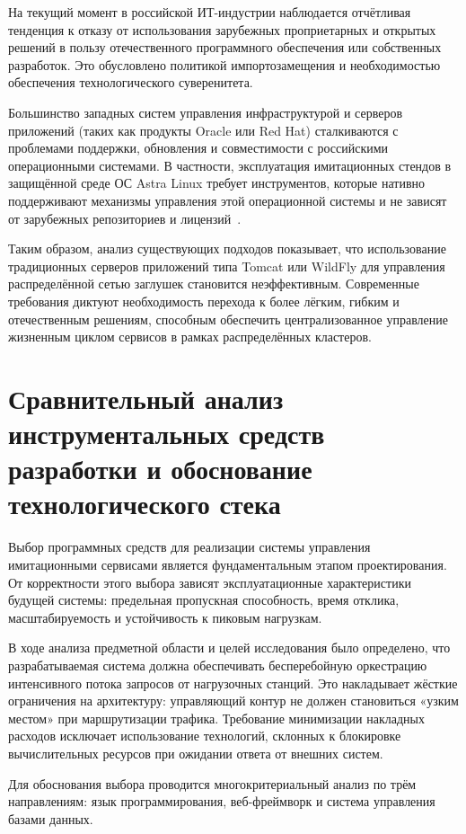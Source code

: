 На текущий момент в российской ИТ-индустрии наблюдается отчётливая тенденция к отказу от использования зарубежных проприетарных и открытых решений в пользу отечественного программного обеспечения или собственных разработок. Это обусловлено политикой импортозамещения и необходимостью обеспечения технологического суверенитета.

Большинство западных систем управления инфраструктурой и серверов приложений (таких как продукты Oracle или Red Hat) сталкиваются с проблемами поддержки, обновления и совместимости с российскими операционными системами. В частности, эксплуатация имитационных стендов в защищённой среде ОС Astra Linux требует инструментов, которые нативно поддерживают механизмы управления этой операционной системы и не зависят от зарубежных репозиториев и лицензий~\cite{burenin-astra}.

Таким образом, анализ существующих подходов показывает, что использование традиционных серверов приложений типа Tomcat или WildFly для управления распределённой сетью заглушек становится неэффективным. Современные требования диктуют необходимость перехода к более лёгким, гибким и отечественным решениям, способным обеспечить централизованное управление жизненным циклом сервисов в рамках распределённых кластеров.

\section{Сравнительный анализ инструментальных средств разработки и обоснование технологического стека}

Выбор программных средств для реализации системы управления имитационными сервисами является фундаментальным этапом проектирования. От корректности этого выбора зависят эксплуатационные характеристики будущей системы: предельная пропускная способность, время отклика, масштабируемость и устойчивость к пиковым нагрузкам.

В ходе анализа предметной области и целей исследования было определено, что разрабатываемая система должна обеспечивать бесперебойную оркестрацию интенсивного потока запросов от нагрузочных станций. Это накладывает жёсткие ограничения на архитектуру: управляющий контур не должен становиться «узким местом» при маршрутизации трафика. Требование минимизации накладных расходов исключает использование технологий, склонных к блокировке вычислительных ресурсов при ожидании ответа от внешних систем.

Для обоснования выбора проводится многокритериальный анализ по трём направлениям: язык программирования, веб-фреймворк и система управления базами данных.

